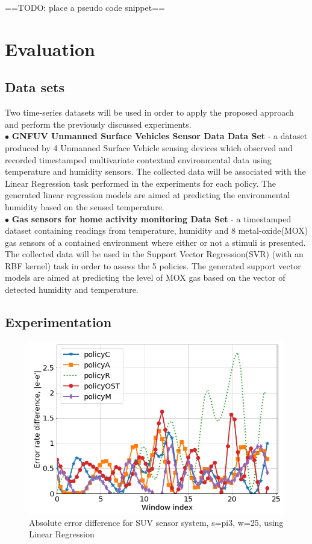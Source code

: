 \documentclass{mpaper}
\begin{document}
==TODO: place a pseudo code snippet==

\section{Evaluation}

\subsection*{Data sets}
Two time-series datasets will be used in order to apply the proposed approach and perform the previously discussed experiments.
\\$\bullet$ \textbf{GNFUV Unmanned Surface Vehicles Sensor Data Data Set} \cite{harth2018} - a dataset produced by 4 Unmanned Surface Vehicle sensing devices which observed and recorded timestamped multivariate contextual environmental data using temperature and humidity sensors. The collected data will be associated with the Linear Regression task performed in the experiments for each policy. The generated linear regression models are aimed at predicting the environmental humidity based on the sensed temperature.
\\$\bullet$ \textbf{Gas sensors for home activity monitoring Data Set } \cite{HUERTA2016169} - a timestamped dataset containing readings from temperature, humidity and 8 metal-oxide(MOX) gas sensors of a contained environment where either or not a stimuli is presented. The collected data will be used in the Support Vector Regression(SVR) (with an RBF kernel) task in order to assess the 5 policies. The generated support vector models are aimed at predicting the level of MOX gas based on the vector of detected humidity and temperature.
\subsection{Experimentation}
\begin{figure}[h]
    \centering
    \includegraphics[scale=0.3]{imgs/lin_reg_pi3_w25.png}
    \caption{Absolute error difference for SUV sensor system, s=pi3, w=25, using Linear Regression}
    \label{fig:err_lin_reg_pi3}
\end{figure}
\end{document}

